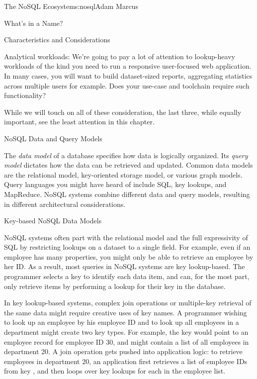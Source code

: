 \begin{aosachapter}{The NoSQL Ecosystem}{s:nosql}{Adam Marcus}
\begin{aosasect1}{What's in a Name?}
\begin{aosasect2}{Characteristics and Considerations}
\begin{aosadescription}
  \item{Analytical workloads}: We're going to pay a lot of
  attention to lookup-heavy workloads of the kind you need to run a
  responsive user-focused web application.  In many cases, you will
  want to build dataset-sized reports, aggregating statistics across
  multiple users for example.  Does your use-case and toolchain
  require such functionality?

\end{aosadescription}

While we will touch on all of these consideration, the last three, while equally important, see the least attention in this chapter.

\end{aosasect2}

\end{aosasect1}

\begin{aosasect1}{NoSQL Data and Query Models}

The \emph{data model} of a database specifies how data is logically
organized.  Its \emph{query model} dictates how the data can be
retrieved and updated.  Common data models are the relational model,
key-oriented storage model, or various graph models.  Query languages
you might have heard of include SQL, key lookups, and MapReduce.
NoSQL systems combine different data and query models, resulting in
different architectural considerations.

\begin{aosasect2}{Key-based NoSQL Data Models}

NoSQL systems often part with the relational model and the full
expressivity of SQL by restricting lookups on a dataset to a single
field.  For example, even if an employee has many properties, you
might only be able to retrieve an employee by her ID\@.  As a result,
most queries in NoSQL systems are key lookup-based.  The programmer
selects a key to identify each data item, and can, for the most part,
only retrieve items by performing a lookup for their key in the
database.

In key lookup-based systems, complex join operations or multiple-key
retrieval of the same data might require creative uses of key names.
A programmer wishing to look up an employee by his
employee ID and to look up all employees in a department might create
two key types.  For example, the key  would point to an employee
record for employee ID 30, and  might
contain a list of all employees in department 20.  A join operation
gets pushed into application logic: to retrieve employees in
department 20, an application first retrieves a list of employee IDs
from key , and then loops over key
lookups for each  in the employee list.


\end{aosasect2}
\end{aosasect1}
\end{aosachapter}
